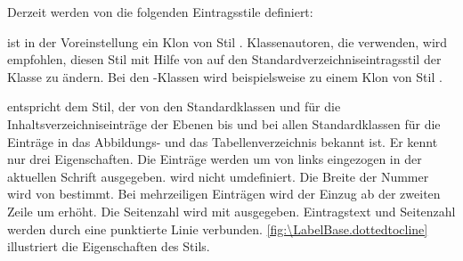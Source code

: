 Derzeit werden von  die folgenden Eintragsstile definiert:
\begin{description}
\item[\PValue{default}] ist in der Voreinstellung ein Klon von Stil
  . Klassenautoren, die  verwenden,
  wird empfohlen, diesen Stil mit Hilfe von
   auf den
  Standardverzeichniseintragsstil der Klasse zu ändern. Bei den
  \KOMAScript-Klassen wird  beispielsweise zu einem Klon von
  Stil .
\item[\PValue{dottedtocline}] entspricht dem Stil, der von den Standardklassen
   und  für die Inhaltsverzeichniseinträge der
  Ebenen  bis  und bei allen
  Standardklassen für die Einträge in das Abbildungs- und das
  Tabellenverzeichnis bekannt ist. Er kennt nur drei Eigenschaften. Die Einträge werden
  um  von links eingezogen in der aktuellen Schrift
  ausgegeben.  wird nicht umdefiniert. Die
  Breite der Nummer wird von  bestimmt. Bei mehrzeiligen
  Einträgen wird der Einzug ab der zweiten Zeile um 
  erhöht. Die Seitenzahl wird mit  ausgegeben. Eintragstext
  und Seitenzahl werden durch eine punktierte Linie
  verbunden. \autoref{fig:\LabelBase.dottedtocline} illustriert die
  Eigenschaften des Stils.
  \begin{figure}
    \centering
\end{figure}
\end{description}
